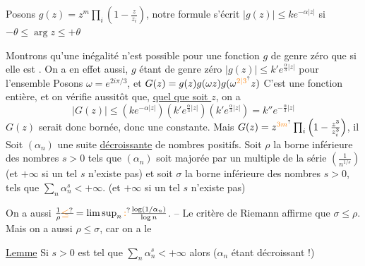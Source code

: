 Posons $g(z)=z^m\prod_i(1-\frac z{z_i})$, notre formule
s'écrit \quad \uline{$|g(z)|\leq ke^{-\alpha|z|}$} \quad si $-\theta\leq\arg z\leq+\theta$

Montrons qu'une  inégalité n'est possible
pour une fonction $g$ de genre zéro que si elle
est  . On a en effet aussi, $g$ étant de genre
zéro \qquad $|g(z)|\leq k'e^{\frac{\alpha}{3}|z|}$ \qquad pour l'ensemble
Posons $\omega=e^{2i\pi/3}$, et $G(z)=g(z)g(\omega z)g(\omega^{\unsure{2|3}}z)$
C'est une fonction entière, et on vérifie
aussitôt que, \uline{quel que soit $z$}, on a
\[ |G(z)|\leq(ke^{-\alpha|z|})(k'e^{\frac{\alpha}{3}|z|})(k'e^{\frac{\alpha}{3}|z|})=k''e^{-\frac{\alpha}{3}|z|} \]
$G(z)$ serait donc bornée, donc une constante.
Mais $G(z)=z^{\unsure{3m}}\prod_i\left(1-\frac{z^3}{z_i^3}\right)$, il
Soit $(\alpha_n)$ une suite \uline{décroissante}  de nombres
positifs. Soit $\rho$ la borne inférieure des nombres
 $s>0$ tels que $(\alpha_n)$ soit majorée par
un multiple de la série $\left(\frac{1}{n^{1/s}}\right)$ (et $+\infty$
si un tel $s$ n'existe pas) et soit $\sigma$ la
borne inférieure des nombres $s>0$, tels que
$\sum_n\alpha_n^s<+\infty$. (et $+\infty$ si un tel $s$ n'existe pas)

On a aussi $\frac1\rho\deleted{\unsure{\leq}}=\limsup_n\unsure{:}\frac{\log(1/\alpha_n)}{\log n}$.  -- Le critère de Riemann affirme
que \deleted{$\unsure{\rho\leq|\rho\leq\sigma}$} $\sigma\leq\rho$. Mais on a aussi $\rho\leq\sigma$,
car on a le

\uline{Lemme} \quad Si $s>0$ est tel que $\sum_n\alpha_n^s<+\infty$
alors \inserted{$\unsure{\geq}$}   ($\alpha_n$ étant décroissant !)

